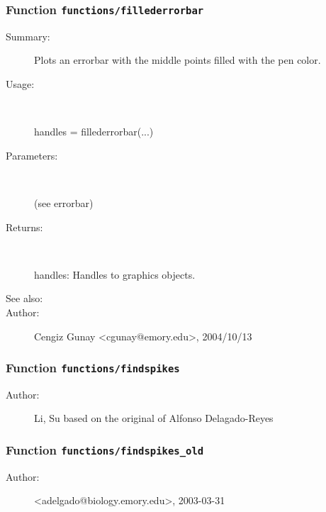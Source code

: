 \subsubsection[Function \texttt{fillederrorbar}]{Function \texttt{functions/fillederrorbar}}%
%
\label{ref_functions__fillederrorbar}%
\hypertarget{ref_functions__fillederrorbar}{}%
\begin{description}
\item[Summary:]Plots an errorbar with the middle points filled with the pen color.
%
\item[Usage:]~%
\begin{lyxcode}%
handles = fillederrorbar(...)
%
\end{lyxcode}%
%
%
\item[Parameters:]~

(see errorbar)
%
\item[Returns:
]~

	handles: Handles to graphics objects.
%
%
\item[See also:]%
%
\item[Author:]%
Cengiz Gunay <cgunay@emory.edu>, 2004/10/13
%
\end{description}
\methodline%
\subsubsection[Function \texttt{findspikes}]{Function \texttt{functions/findspikes}}%
%
\label{ref_functions__findspikes}%
\hypertarget{ref_functions__findspikes}{}%
\begin{description}
%
%
%
%
%
%
%
\item[Author:]%
Li, Su based on the original of Alfonso Delagado-Reyes
%
\end{description}
\methodline%
\subsubsection[Function \texttt{findspikes\_old}]{Function \texttt{functions/findspikes\_old}}%
%
\label{ref_functions__findspikes_old}%
\hypertarget{ref_functions__findspikes_old}{}%
\begin{description}
%
%
%
%
%
%
%
\item[Author:]%
<adelgado@biology.emory.edu>, 2003-03-31
%
\end{description}
\methodline%

